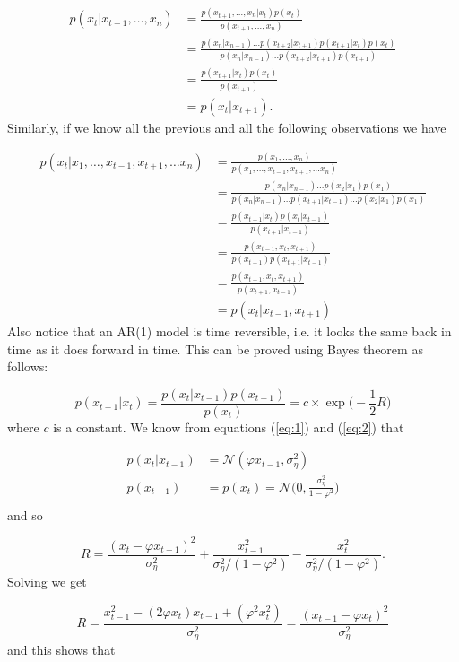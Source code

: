 \documentclass[11pt,a4paper]{article}
\begin{document}
{\begin{align*}
    p(x_t | x_{t+1}, \dots, x_n) &= \frac{p(x_{t+1},\dots, x_n | x_t) p(x_t)}{p(x_{t+1}, \dots, x_n)}\\
    &= \frac{p(x_n | x_{n-1})\dots p(x_{t+2} | x_{t+1}) p(x_{t+1} | x_t) p(x_t)}{p(x_n | x_{n-1})\dots p(x_{t+2} | x_{t+1}) p(x_{t+1})}\\
    &= \frac{p(x_{t+1} | x_t) p(x_t)}{p(x_{t+1})}\\
    &= p(x_t | x_{t+1}).
\end{align*}
Similarly, if we know all the previous and all the following observations we have

\begin{align*}
    p(x_t | x_1, \dots, x_{t-1}, x_{t+1}, \dots x_n) &= \frac{p(x_1,\dots, x_n)}{p(x_1, \dots, x_{t-1}, x_{t+1}, \dots x_n)}\\
    &= \frac{p(x_n | x_{n-1})\dots p(x_2 | x_1) p(x_1)}{p(x_n | x_{n-1})\dots p(x_{t+1} | x_{t-1}) \dots p(x_2 | x_1) p(x_1)}\\
    &= \frac{p(x_{t+1} | x_t) p(x_t | x_{t-1})}{p(x_{t+1} | x_{t-1})}\\
    &= \frac{p(x_{t-1}, x_t, x_{t+1})}{p(x_{t-1}) p(x_{t+1} | x_{t-1})}\\
    &= \frac{p(x_{t-1}, x_t, x_{t+1})}{p(x_{t+1}, x_{t-1})}\\
    &= p(x_t | x_{t-1}, x_{t+1})
\end{align*}
Also notice that an AR(1) model is time reversible, i.e. it looks the same back in time as it does forward in time.
This can be proved using Bayes theorem as follows:

\[
    p(x_{t-1} | x_t) = \frac{p(x_t | x_{t-1}) p(x_{t-1})}{p(x_t)} = c\times \exp\Big(-\frac{1}{2} R\Big)
\]
where $c$ is a constant.
We know from equations (\ref{eq:1}) and (\ref{eq:2}) that 

\begin{align*}
    p(x_t | x_{t-1}) &= \mathcal{N}(\varphi x_{t-1}, \sigma^2_\eta)\\
    p(x_{t-1}) &= p(x_t) = \mathcal{N} \Bigg(0, \frac{\sigma^2_\eta}{1-\varphi^2} \Bigg)\\
\end{align*}
and so 

\[
    R = \frac{(x_t - \varphi x_{t-1})^2}{\sigma^2_\eta} + \frac{x_{t-1}^2}{\sigma^2_\eta / (1-\varphi^2)} - \frac{x_{t}^2}{\sigma^2_\eta / (1-\varphi^2)}.
\]
Solving we get

\[
    R = \frac{x_{t-1}^2 - (2\varphi x_t) x_{t-1}+ (\varphi^2 x_t^2)}{\sigma^2_\eta} = \frac{(x_{t-1} - \varphi x_t)^2}{\sigma^2_\eta}
\]
and this shows that

}
\end{document}
